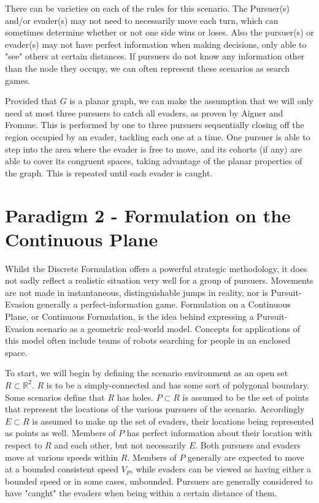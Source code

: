 \documentclass{article}
\begin{document}
There can be varieties on each of the rules for this scenario. The Pursuer(s) and/or evader(s) may not need to necessarily move each turn, which can sometimes determine whether or not one side wins or loses. Also the pursuer(s) or evader(s) may not have perfect information when making decisions, only able to "see" others at certain distances. If pursuers do not know any information other than the node they occupy, we can often represent these scenarios as search games. \cite{parsons}

Provided that \(G\) is a planar graph, we can make the assumption that we will only need at most three pursuers to catch all evaders, as proven by Aigner and Fromme. This is performed by one to three pursuers sequentially closing off the region occupied by an evader, tackling each one at a time. One pursuer is able to step into the area where the evader is free to move, and its cohorts (if any) are able to cover its congruent spaces, taking advantage of the planar properties of the graph. This is repeated until each evader is caught. \cite{copsRobbers}

\section{Paradigm 2 - Formulation on the Continuous Plane}
Whilst the Discrete Formulation offers a powerful strategic methodology, it does not sadly reflect a realistic situation very well for a group of pursuers. Movements are not made in instantaneous, distinguishable jumps in reality, nor is Pursuit-Evasion generally a perfect-information game. Formulation on a Continuous Plane, or Continuous Formulation, is the idea behind expressing a Pursuit-Evasion scenario as a geometric real-world model. Concepts for applications of this model often include teams of robots searching for people in an enclosed space.

To start, we will begin by defining the scenario environment as an open set \(R\subset\mathbb{R}^2\). \(R\) is to be a simply-connected and has some sort of polygonal boundary. Some scenarios define that \(R\) has holes. \(P\subset R\) is assumed to be the set of points that represent the locations of the various pursuers of the scenario. Accordingly \(E\subset R\) is assumed to make up the set of evaders, their locations being represented as points as well. Members of \(P\) has perfect information about their location with respect to \(R\) and each other, but not necessarily \(E\). Both pursuers and evaders move at various speeds within \(R\). Members of \(P\) generally are expected to move at a bounded consistent speed \(V_P\), while evaders can be viewed as having either a bounded speed or in some cases, unbounded. \cite{limVis, robotics} Pursuers are generally considered to have "caught" the evaders when being within a certain distance of them.
\end{document}

